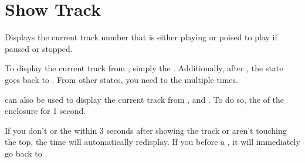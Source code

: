 \section{Show Track} \label{Show Track} 

Displays the current track number that is either playing or poised to play if
paused or stopped.


To display the current track from , simply  the .
Additionally, after , the state goes back to .
From other states, you need to  the  multiple times.


 can also be used to display the current track from , 
and .  To do so,  the  of the enclosure for
\num{1} second.



If you don't  or  the  within \num{3} seconds after
showing the track or aren't touching the top, the time will automatically
redisplay.  If you  before a ,
it will immediately go back to .


